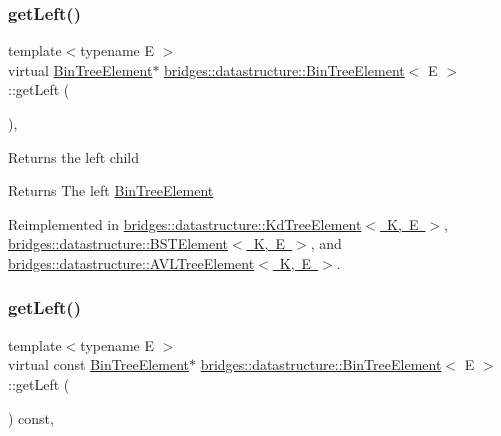 \subsubsection{\texorpdfstring{getLeft()}{getLeft()}\hspace{0.1cm}{\footnotesize\ttfamily [1/2]}}
{\footnotesize\ttfamily template$<$typename E $>$ \\
virtual \mbox{\hyperlink{classbridges_1_1datastructure_1_1_bin_tree_element}{Bin\+Tree\+Element}}$\ast$ \mbox{\hyperlink{classbridges_1_1datastructure_1_1_bin_tree_element}{bridges\+::datastructure\+::\+Bin\+Tree\+Element}}$<$ E $>$\+::get\+Left (\begin{DoxyParamCaption}{ }\end{DoxyParamCaption})\hspace{0.3cm}{\ttfamily [inline]}, {\ttfamily [virtual]}}

Returns the left child \begin{DoxyReturn}{Returns}
The left \mbox{\hyperlink{classbridges_1_1datastructure_1_1_bin_tree_element}{Bin\+Tree\+Element}} 
\end{DoxyReturn}


Reimplemented in \mbox{\hyperlink{classbridges_1_1datastructure_1_1_kd_tree_element_a875bfa2dfd88a7740f7bcd28a117c12a}{bridges\+::datastructure\+::\+Kd\+Tree\+Element$<$ K, E $>$}}, \mbox{\hyperlink{classbridges_1_1datastructure_1_1_b_s_t_element_af863c624691c11db26ae3b6d723d1f5c}{bridges\+::datastructure\+::\+B\+S\+T\+Element$<$ K, E $>$}}, and \mbox{\hyperlink{classbridges_1_1datastructure_1_1_a_v_l_tree_element_ab05925e343b9fa71b61c71e8034e1293}{bridges\+::datastructure\+::\+A\+V\+L\+Tree\+Element$<$ K, E $>$}}.

\mbox{\label{classbridges_1_1datastructure_1_1_bin_tree_element_ae14a70e2d25ad62337c87059b0cadb48}} 
\subsubsection{\texorpdfstring{getLeft()}{getLeft()}\hspace{0.1cm}{\footnotesize\ttfamily [2/2]}}
{\footnotesize\ttfamily template$<$typename E $>$ \\
virtual const \mbox{\hyperlink{classbridges_1_1datastructure_1_1_bin_tree_element}{Bin\+Tree\+Element}}$\ast$ \mbox{\hyperlink{classbridges_1_1datastructure_1_1_bin_tree_element}{bridges\+::datastructure\+::\+Bin\+Tree\+Element}}$<$ E $>$\+::get\+Left (\begin{DoxyParamCaption}{ }\end{DoxyParamCaption}) const\hspace{0.3cm}{\ttfamily [inline]}, {\ttfamily [virtual]}}

